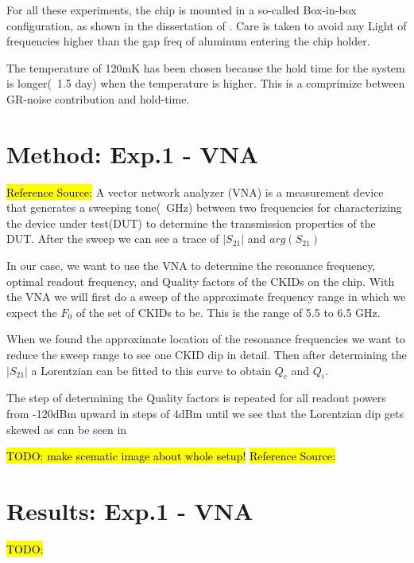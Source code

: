 For all these experiments, the chip is mounted in a so-called Box-in-box configuration, as shown in the dissertation of \cite{devisserVisser2014Quasiparticle2014}. Care is taken to avoid any Light of frequencies higher than the gap freq of aluminum entering the chip holder.

The temperature of 120mK has been chosen because the hold time for the system is longer(~1.5 day) when the temperature is higher\cite{devisserVisser2014Quasiparticle2014}. This is a comprimize between GR-noise contribution and hold-time.

\FloatBarrier
\section{Method: Exp.1 - VNA}
\label{sec:M_VNA}
\hl{Reference Source:} \cite{devisserReadoutpowerHeatingHysteretic2010}
A vector network analyzer (VNA) is a measurement device that generates a sweeping tone(~GHz) between two frequencies for characterizing the device under test(DUT) to determine the transmission properties of the DUT. After the sweep we can see a trace of $|S_{21}|$ and $arg(S_{21})$

In our case, we want to use the VNA to determine the resonance frequency, optimal readout frequency, and Quality factors of the CKIDs on the chip. With the VNA we will first do a sweep of the approximate frequency range in which we expect the $F_0$ of the set of CKIDs to be. This is the range of 5.5 to 6.5 GHz.

When we found the approximate location of the resonance frequencies we want to reduce the sweep range to see one CKID dip in detail. Then after determining the $|S_{21}|$ a Lorentzian can be fitted to this curve to obtain $Q_c$ and $Q_i$.

The step of determining the Quality factors is repeated for all readout powers from -120dBm upward in steps of 4dBm until we see that the Lorentzian dip gets skewed as can be seen in \cite{devisserReadoutpowerHeatingHysteretic2010}

\hl{TODO: make scematic image about whole setup!}
\hl{Reference Source:}



\section{Results: Exp.1 - VNA}
\hl{TODO:}
